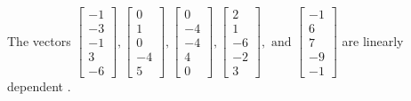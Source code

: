 \begin{exercise}
\begin{exerciseStatement}
  \end{exerciseStatement}
  \begin{exerciseAnswer}
   The vectors \(\left[\begin{array}{r}
-1 \\
-3 \\
-1 \\
3 \\
-6
\end{array}\right] , \left[\begin{array}{r}
0 \\
1 \\
0 \\
-4 \\
5
\end{array}\right] , \left[\begin{array}{r}
0 \\
-4 \\
-4 \\
4 \\
0
\end{array}\right] , \left[\begin{array}{r}
2 \\
1 \\
-6 \\
-2 \\
3
\end{array}\right] , \text{ and } \left[\begin{array}{r}
-1 \\
6 \\
7 \\
-9 \\
-1
\end{array}\right]\) are 
  	 linearly dependent  .
  


  \end{exerciseAnswer}
\end{exercise}